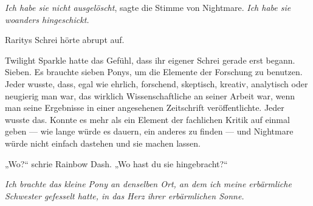 \emph{Ich habe sie nicht ausgelöscht}, sagte die Stimme von Nightmare. \emph{Ich habe sie woanders hingeschickt.}

Raritys Schrei hörte abrupt auf.

Twilight Sparkle hatte das Gefühl, dass ihr eigener Schrei gerade erst begann. Sieben. Es brauchte sieben Ponys, um die Elemente der Forschung zu benutzen. Jeder wusste, dass, egal wie ehrlich, forschend, skeptisch, kreativ, analytisch oder neugierig man war, das wirklich Wissenschaftliche an seiner Arbeit war, wenn man seine Ergebnisse in einer angesehenen Zeitschrift veröffentlichte. Jeder wusste das. Konnte es mehr als ein Element der fachlichen Kritik auf einmal geben — wie lange würde es dauern, ein anderes zu finden — und Nightmare würde nicht einfach dastehen und sie machen lassen.

„Wo?“ schrie Rainbow Dash.
„Wo hast du sie hingebracht?“

\emph{Ich brachte das kleine Pony an denselben Ort, an dem ich meine erbärmliche Schwester gefesselt hatte, in das Herz ihrer erbärmlichen Sonne.}

